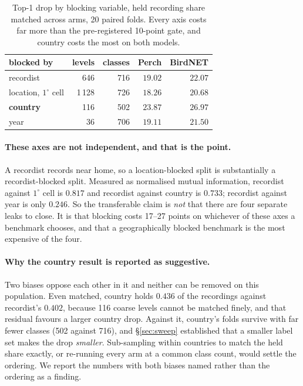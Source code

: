 \documentclass[10pt,twocolumn,a4paper]{article}
\begin{document}
\begin{table}[t]
\footnotesize
\setlength{\tabcolsep}{4pt}
\caption{Top-1 drop by blocking variable, held recording share matched across arms, 20 paired
folds. Every axis costs far more than the pre-registered 10-point gate, and country costs the
most on both models.}
\label{tab:axes}
\begin{tabular}{L{2.5cm} r r r r}
\toprule
blocked by & levels & classes & Perch & BirdNET \\
\midrule
recordist & 646 & 716 & $19.02$ & $22.07$ \\
location, $1^\circ$ cell & 1\,128 & 726 & $18.26$ & $20.68$ \\
\textbf{country} & 116 & 502 & $\mathbf{23.87}$ & $\mathbf{26.97}$ \\
year & 36 & 706 & $19.11$ & $21.50$ \\
\bottomrule
\end{tabular}
\end{table}

\paragraph{These axes are not independent, and that is the point.} A recordist records near
home, so a location-blocked split is substantially a recordist-blocked split. Measured as
normalised mutual information, recordist against $1^\circ$ cell is $0.817$ and recordist
against country is $0.733$; recordist against year is only $0.246$. So the transferable claim
is \emph{not} that there are four separate leaks to close. It is that blocking costs 17--27
points on whichever of these axes a benchmark chooses, and that a geographically blocked
benchmark is the most expensive of the four.

\paragraph{Why the country result is reported as suggestive.} Two biases oppose each other in
it and neither can be removed on this population. Even matched, country holds $0.436$ of the
recordings against recordist's $0.402$, because 116 coarse levels cannot be matched finely, and
that residual favours a larger country drop. Against it, country's folds survive with far fewer
classes (502 against 716), and \S\ref{sec:sweep} established that a smaller label set makes the
drop \emph{smaller}. Sub-sampling within countries to match the held share exactly, or
re-running every arm at a common class count, would settle the ordering. We report the numbers
with both biases named rather than the ordering as a finding.
\end{document}
